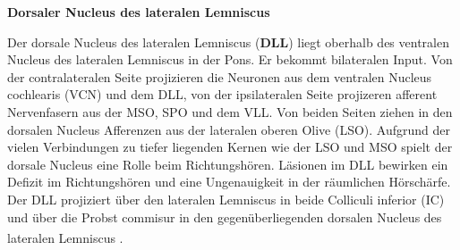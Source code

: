 \documentclass[12pt,a4paper,pdftex]{article}
\begin{document}

\textbf{Dorsaler Nucleus des lateralen Lemniscus}

Der dorsale Nucleus des lateralen Lemniscus (\textbf{DLL}) liegt oberhalb des ventralen Nucleus des lateralen Lemniscus in der Pons. Er bekommt bilateralen Input. Von der contralateralen Seite projizieren die Neuronen aus dem ventralen Nucleus cochlearis (VCN) und dem DLL, von der ipsilateralen Seite projizeren afferent Nervenfasern aus der MSO, SPO und dem VLL. Von beiden Seiten ziehen in den dorsalen Nucleus Afferenzen aus der lateralen oberen Olive (LSO).
Aufgrund der vielen Verbindungen zu tiefer liegenden Kernen wie der LSO und MSO spielt der dorsale Nucleus eine Rolle beim Richtungshören. Läsionen im DLL bewirken ein Defizit im Richtungshören und eine Ungenauigkeit in der räumlichen Hörschärfe. 
Der DLL projiziert über den lateralen Lemniscus in beide Colliculi inferior (IC) und über die Probst commisur in den gegenüberliegenden dorsalen Nucleus des lateralen Lemniscus
\textsuperscript{\cite[29]{paxinos2014rat}}.
\end{document}
